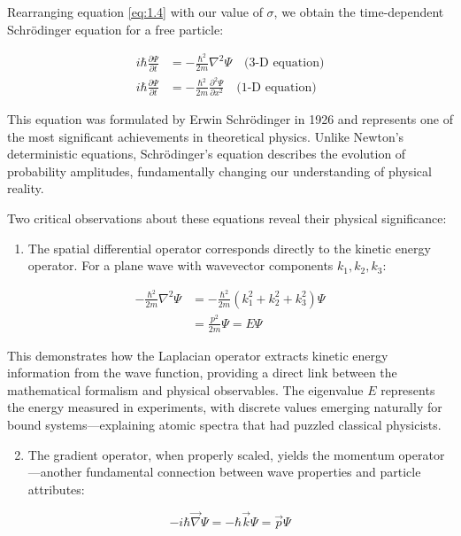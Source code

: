 \documentclass[italian]{HKNdocument}
\begin{document}
Rearranging equation \eqref{eq:1.4} with our value of $\sigma$, we obtain the time-dependent Schrödinger equation for a free particle:

\begin{align}
i \hbar \frac{\partial \Psi}{\partial t} & =-\frac{\hbar^{2}}{2 m} \nabla^{2} \Psi \quad \text{(3-D equation)} \\
i \hbar \frac{\partial \Psi}{\partial t} & =-\frac{\hbar^{2}}{2 m} \frac{\partial^{2} \Psi}{\partial x^{2}} \quad \text{(1-D equation)}
\end{align}

This equation was formulated by Erwin Schrödinger in 1926 and represents one of the most significant achievements in theoretical physics. Unlike Newton's deterministic equations, Schrödinger's equation describes the evolution of probability amplitudes, fundamentally changing our understanding of physical reality.

Two critical observations about these equations reveal their physical significance:

\begin{enumerate}
  \item The spatial differential operator corresponds directly to the kinetic energy operator. For a plane wave with wavevector components $k_1, k_2, k_3$:
\end{enumerate}

\begin{align}
-\frac{\hbar^{2}}{2 m} \nabla^{2} \Psi & =-\frac{\hbar^{2}}{2 m}\left(k_{1}^{2}+k_{2}^{2}+k_{3}^{2}\right) \Psi  \\
& =\frac{p^{2}}{2 m} \Psi=E \Psi
\end{align}

This demonstrates how the Laplacian operator extracts kinetic energy information from the wave function, providing a direct link between the mathematical formalism and physical observables. The eigenvalue $E$ represents the energy measured in experiments, with discrete values emerging naturally for bound systems—explaining atomic spectra that had puzzled classical physicists.


\begin{enumerate}
  \setcounter{enumi}{1}
  \item The gradient operator, when properly scaled, yields the momentum operator—another fundamental connection between wave properties and particle attributes:
\end{enumerate}

\begin{equation}
-i \hbar \vec{\nabla} \Psi=-\hbar \vec{k} \Psi=\vec{p} \Psi
\end{equation}
\end{document}
